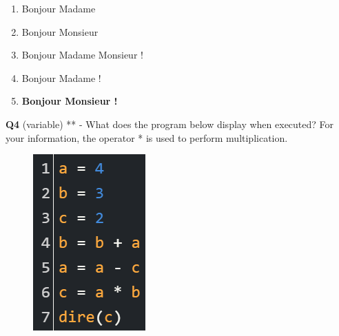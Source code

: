 \documentclass[14pt]{extarticle}
\begin{document}
\begin{enumerate}[label=\alph*)]
    \item Bonjour Madame
    \item Bonjour Monsieur
    \item Bonjour Madame Monsieur !
    \item Bonjour Madame !
    \item \textbf{Bonjour Monsieur !}
\end{enumerate}
\newpage
\textbf{Q4} (variable) ** - 
What does the program below display when executed? For your information, the operator * is used to perform multiplication.

\begin{figure}[H]
    \centering
    \includegraphics[width=0.25\linewidth]{images/posttest/_Q4.png}
\end{figure}
\end{document}
